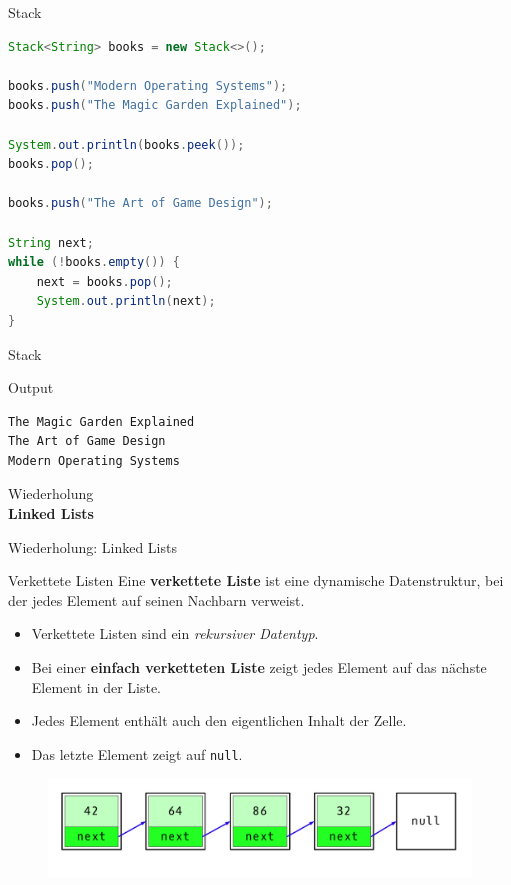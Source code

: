 \documentclass[18pt]{beamer}
\begin{document}
\begin{frame}[fragile]{Stack}
    \begin{lstlisting}[language=Java,basicstyle=\scriptsize]
Stack<String> books = new Stack<>();

books.push("Modern Operating Systems");
books.push("The Magic Garden Explained");

System.out.println(books.peek());
books.pop();

books.push("The Art of Game Design");

String next;
while (!books.empty()) {
    next = books.pop();
    System.out.println(next);
}
    \end{lstlisting}

\end{frame}

\begin{frame}[fragile]{Stack}
    \begin{exampleblock}{Output}
        \begin{lstlisting}[language=Java]
The Magic Garden Explained
The Art of Game Design
Modern Operating Systems
        \end{lstlisting}
    \end{exampleblock}

\end{frame}

\begin{frame}{\quad}
    \center
    \Huge{Wiederholung\\ \textbf{Linked Lists}}
\end{frame}

\begin{frame}{Wiederholung: Linked Lists}
    \begin{block}{Verkettete Listen}
        Eine \textbf{verkettete Liste} ist eine dynamische Datenstruktur, bei der jedes Element auf seinen Nachbarn verweist.
    \end{block}

    \begin{itemize}
        \item Verkettete Listen sind ein \textit{rekursiver Datentyp}.
        \item Bei einer \textbf{einfach verketteten Liste} zeigt jedes Element auf das nächste Element in der Liste.
        \item Jedes Element enthält auch den eigentlichen Inhalt der Zelle.
        \item Das letzte Element zeigt auf \texttt{null}.
    \end{itemize}

    \begin{figure}
        \includegraphics[scale=.3]{img/simplelinkedlist.png}
    \end{figure}
\end{frame}
\end{document}
